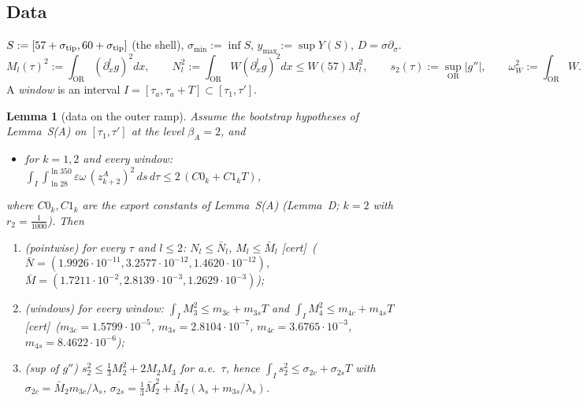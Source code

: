 \documentclass[11pt]{article}
\newtheorem{lemma}{Lemma}\newtheorem{proposition}{Proposition}\newtheorem{remark}{Remark}\newtheorem{definition}{Definition}
\newcommand{\tC}{\textup{[cert]}}\newcommand{\tHd}{\textup{[hand]}}\newcommand{\tE}{\textup{[est]}}\newcommand{\tS}{\textup{[sym]}}
\newcommand{\OR}{\mathrm{OR}}\newcommand{\eI}{\varepsilon_I}
\begin{document}
\subsection{Data}\label{F:sec:data}
$S:=[57+\sigma_{\rm tip},60+\sigma_{\rm tip}]$ (the shell), $\sigma_{\min}:=\inf S$, $y_{\max}:=\sup Y(S)$, $D=\sigma\partial_\sigma$.
\[M_l(\tau)^2:=\int_{\OR}(\partial_x^lg)^2dx,\qquad N_l^2:=\int_{\OR}W(\partial_x^lg)^2dx\le W(57)M_l^2,\qquad s_2(\tau):=\sup_{\OR}|g''|,\qquad\omega_W^2:=\int_{\OR}W .\]
A \emph{window} is an interval $I=[\tau_a,\tau_a+T]\subset[\tau_1,\tau']$.

\begin{lemma}[data on the outer ramp]\label{F:lem:data}
Assume the bootstrap hypotheses of Lemma~S(A) on $[\tau_1,\tau']$ at the level $\beta_A=2$, and
\begin{itemize}[leftmargin=3.2em]
\item[\textup{(B$\Phi$)}] for $k=1,2$ and every window: $\displaystyle\int_I\!\int_{\ln28}^{\ln350}\varepsilon\omega\,(z^A_{k+2})^2\,ds\,d\tau\le2\,(C0_k+C1_kT)$,
\end{itemize}
where $C0_k,C1_k$ are the export constants of Lemma~S(A) (Lemma~D; $k=2$ with $r_2=\frac1{1000}$). Then
\begin{enumerate}[label=(\alph*)]
\item \emph{(pointwise)} for every $\tau$ and $l\le2$: $N_l\le\bar N_l$, $M_l\le\bar M_l$ \tC\ ($\bar N=(1.9926\cdot10^{-11}, 3.2577\cdot10^{-12}, 1.4620\cdot10^{-12})$, $\bar M=(1.7211\cdot10^{-2}, 2.8139\cdot10^{-3}, 1.2629\cdot10^{-3})$);
\item \emph{(windows)} for every window: $\int_IM_3^2\le m_{3c}+m_{3s}T$ and $\int_IM_4^2\le m_{4c}+m_{4s}T$ \tC\ ($m_{3c}=1.5799\cdot10^{-5}$, $m_{3s}=2.8104\cdot10^{-7}$, $m_{4c}=3.6765\cdot10^{-3}$, $m_{4s}=8.4622\cdot10^{-6}$);
\item \emph{(sup of $g''$)} $s_2^2\le\frac13M_2^2+2M_2M_3$ for a.e.\ $\tau$, hence $\int_Is_2^2\le\sigma_{2c}+\sigma_{2s}T$ with $\sigma_{2c}=\bar M_2m_{3c}/\lambda_s$, $\sigma_{2s}=\frac13\bar M_2^2+\bar M_2(\lambda_s+m_{3s}/\lambda_s)$.
\end{enumerate}
\end{lemma}
\end{document}
